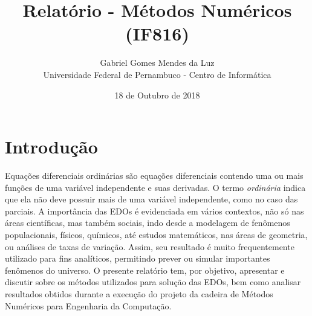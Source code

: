 \documentclass{article}
\title{Relatório - Métodos Numéricos (IF816)}
\author{Gabriel Gomes Mendes da Luz\\Universidade Federal de Pernambuco - Centro de Informática}
\date{18 de Outubro de 2018}
\begin{document}
\begin{otherlanguage}{brazil}

\maketitle
\newpage

\tableofcontents

\newpage

\section{Introdução}
    Equações diferenciais ordinárias são equações diferenciais contendo uma ou mais funções de uma variável independente e suas derivadas. O termo \textit{ordinária} indica que ela não deve possuir mais de uma variável independente, como no caso das parciais.\newline
    A importância das EDOs é evidenciada em vários contextos, não só nas áreas científicas, mas também sociais, indo desde a modelagem de fenômenos populacionais, físicos, químicos, até estudos matemáticos, nas áreas de geometria, ou análises de taxas de variação. Assim, seu resultado é muito frequentemente utilizado para fins analíticos, permitindo prever ou simular importantes fenômenos do universo.\newline
    O presente relatório tem, por objetivo, apresentar e discutir sobre os métodos utilizados para solução das EDOs, bem como analisar resultados obtidos durante a execução do projeto da cadeira de Métodos Numéricos para Engenharia da Computação.
\newpage


\end{otherlanguage}
\end{document}
